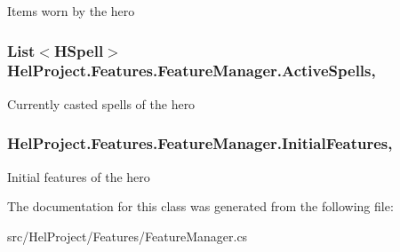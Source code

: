 Items worn by the hero 

\hypertarget{class_hel_project_1_1_features_1_1_feature_manager_afc065fffad775f30c796536009f67e24}{}
\subsubsection[{Active\+Spells}]{\setlength{\rightskip}{0pt plus 5cm}List$<${\bf H\+Spell}$>$ Hel\+Project.\+Features.\+Feature\+Manager.\+Active\+Spells\hspace{0.3cm}{\ttfamily [get]}, {\ttfamily [set]}}\label{class_hel_project_1_1_features_1_1_feature_manager_afc065fffad775f30c796536009f67e24}


Currently casted spells of the hero 

\hypertarget{class_hel_project_1_1_features_1_1_feature_manager_a11ca4dbbba29012ad2633728518e5dd7}{}
\subsubsection[{Initial\+Features}]{ Hel\+Project.\+Features.\+Feature\+Manager.\+Initial\+Features\hspace{0.3cm}{\ttfamily [get]}, {\ttfamily [set]}}\label{class_hel_project_1_1_features_1_1_feature_manager_a11ca4dbbba29012ad2633728518e5dd7}


Initial features of the hero 



The documentation for this class was generated from the following file\+:\begin{DoxyCompactItemize}
\item 
src/\+Hel\+Project/\+Features/Feature\+Manager.\+cs\end{DoxyCompactItemize}
